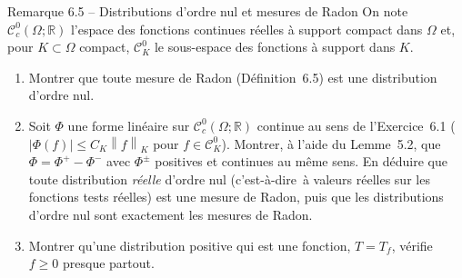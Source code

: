 \documentclass[11pt,a4paper]{article}
\newcommand{\R}{\mathbb{R}}
\newcommand{\norm}[1]{\left\|#1\right\|}
\newcommand{\Cc}{\mathcal{C}^0_c}
\newcommand{\ie}{c'est-à-dire}
\theoremstyle{definition}
\begin{document}
\begin{exo}{Remarque 6.5 -- Distributions d'ordre nul et mesures de Radon}
On note $\Cc(\Omega;\R)$ l'espace des fonctions continues réelles à support compact dans $\Omega$ et, pour $K\subset\Omega$ compact, $\mathcal C^0_K$ le sous-espace des fonctions à support dans $K$.
\begin{enumerate}[label=(\alph*)]
  \item Montrer que toute mesure de Radon (Définition~6.5) est une distribution d'ordre nul.
  \item Soit $\Phi$ une forme linéaire sur $\Cc(\Omega;\R)$ continue au sens de l'Exercice~6.1 ($|\Phi(f)|\le C_K\norm f_K$ pour $f\in\mathcal C^0_K$). Montrer, à l'aide du Lemme~5.2, que $\Phi=\Phi^+-\Phi^-$ avec $\Phi^\pm$ positives et continues au même sens. En déduire que toute distribution \emph{réelle} d'ordre nul (\ie\ à valeurs réelles sur les fonctions tests réelles) est une mesure de Radon, puis que les distributions d'ordre nul sont exactement les mesures de Radon.
  \item Montrer qu'une distribution positive qui est une fonction, $T=T_f$, vérifie $f\ge0$ presque partout.
\end{enumerate}
\end{exo}
\end{document}

